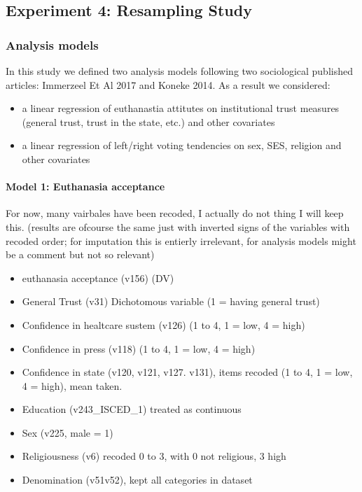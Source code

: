 \maketitle
\subsection{Experiment 4: Resampling Study}

\subsubsection{Analysis models}

In this study we defined two analysis models following two sociological published articles: 
Immerzeel Et Al 2017 and Koneke 2014. As a result we considered:
\begin{itemize}
	\item a linear regression of euthanastia attitutes on institutional trust measures (general trust, 
		trust in the state, etc.) and other covariates
	\item a linear regression of left/right voting tendencies on sex, SES, religion and other covariates
\end{itemize}

\paragraph{Model 1: Euthanasia acceptance}
For now, many vairbales have been recoded, I actually do not thing I will keep this.
(results are ofcourse the same just with inverted signs of the variables with recoded
order; for imputation this is entierly irrelevant, for analysis models might be
a comment but not so relevant)

\begin{itemize}
	\item euthanasia acceptance (v156) (DV)
	\item General Trust (v31) Dichotomous variable (1 = having general trust)
	\item Confidence in healtcare sustem (v126) (1 to 4, 1 = low, 4 = high)
	\item Confidence in press (v118) (1 to 4, 1 = low, 4 = high)
	\item Confidence in state (v120, v121, v127. v131), items recoded  (1 to 4, 
		1 = low, 4 = high), mean taken.
	\item Education (v243\_ISCED\_1) treated as continuous
	\item Sex (v225, male = 1)
	\item Religiousness (v6) recoded 0 to 3, with 0 not religious, 3 high
	\item Denomination (v51v52), kept all categories in dataset
\end{itemize}

